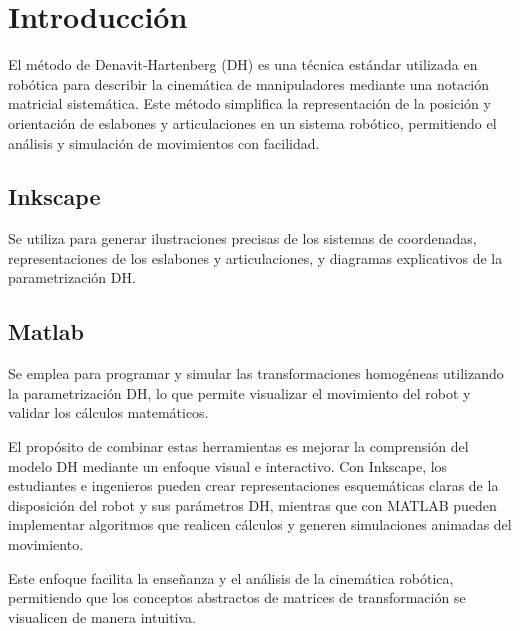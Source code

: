 \section{\textbf{Introducción}}

El método de Denavit-Hartenberg (DH) es una técnica estándar utilizada en robótica para describir la cinemática de manipuladores mediante una notación matricial sistemática. Este método simplifica la representación de la posición y orientación de eslabones y articulaciones en un sistema robótico, permitiendo el análisis y simulación de movimientos con facilidad.

\subsection*{\quad\textbf{Inkscape}}
Se utiliza para generar ilustraciones precisas de los sistemas de coordenadas, representaciones de los eslabones y articulaciones, y diagramas explicativos de la parametrización DH.

\subsection*{\quad\textbf{Matlab}}
Se emplea para programar y simular las transformaciones homogéneas utilizando la parametrización DH, lo que permite visualizar el movimiento del robot y validar los cálculos matemáticos.
\vspace{0.5cm}

El propósito de combinar estas herramientas es mejorar la comprensión del modelo DH mediante un enfoque visual e interactivo. Con Inkscape, los estudiantes e ingenieros pueden crear representaciones esquemáticas claras de la disposición del robot y sus parámetros DH, mientras que con MATLAB pueden implementar algoritmos que realicen cálculos y generen simulaciones animadas del movimiento.

Este enfoque facilita la enseñanza y el análisis de la cinemática robótica, permitiendo que los conceptos abstractos de matrices de transformación se visualicen de manera intuitiva.
\pagebreak